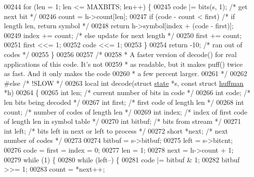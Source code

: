 \begin{DoxyCode}
00244     \textcolor{keywordflow}{for} (len = 1; len <= MAXBITS; len++) \{
00245         code |= bits(s, 1);             \textcolor{comment}{/* get next bit */}
00246         count = h->count[len];
00247         \textcolor{keywordflow}{if} (code - count < first)       \textcolor{comment}{/* if length len, return symbol */}
00248             \textcolor{keywordflow}{return} h->symbol[index + (code - first)];
00249         index += count;                 \textcolor{comment}{/* else update for next length */}
00250         first += count;
00251         first <<= 1;
00252         code <<= 1;
00253     \}
00254     \textcolor{keywordflow}{return} -10;                         \textcolor{comment}{/* ran out of codes */}
00255 \}
00256 
00257 \textcolor{comment}{/*}
00258 \textcolor{comment}{ * A faster version of decode() for real applications of this code.   It's not}
00259 \textcolor{comment}{ * as readable, but it makes puff() twice as fast.  And it only makes the code}
00260 \textcolor{comment}{ * a few percent larger.}
00261 \textcolor{comment}{ */}
00262 \textcolor{preprocessor}{#else }\textcolor{comment}{/* !SLOW */}\textcolor{preprocessor}{}
00263 local \textcolor{keywordtype}{int} decode(\textcolor{keyword}{struct} \hyperlink{structstate}{state} *s, \textcolor{keyword}{const} \textcolor{keyword}{struct} \hyperlink{structhuffman}{huffman} *h)
00264 \{
00265     \textcolor{keywordtype}{int} len;            \textcolor{comment}{/* current number of bits in code */}
00266     \textcolor{keywordtype}{int} code;           \textcolor{comment}{/* len bits being decoded */}
00267     \textcolor{keywordtype}{int} first;          \textcolor{comment}{/* first code of length len */}
00268     \textcolor{keywordtype}{int} count;          \textcolor{comment}{/* number of codes of length len */}
00269     \textcolor{keywordtype}{int} index;          \textcolor{comment}{/* index of first code of length len in symbol table */}
00270     \textcolor{keywordtype}{int} bitbuf;         \textcolor{comment}{/* bits from stream */}
00271     \textcolor{keywordtype}{int} left;           \textcolor{comment}{/* bits left in next or left to process */}
00272     \textcolor{keywordtype}{short} *next;        \textcolor{comment}{/* next number of codes */}
00273 
00274     bitbuf = s->bitbuf;
00275     left = s->bitcnt;
00276     code = first = index = 0;
00277     len = 1;
00278     next = h->count + 1;
00279     \textcolor{keywordflow}{while} (1) \{
00280         \textcolor{keywordflow}{while} (left--) \{
00281             code |= bitbuf & 1;
00282             bitbuf >>= 1;
00283             count = *next++;

\end{DoxyCode}
